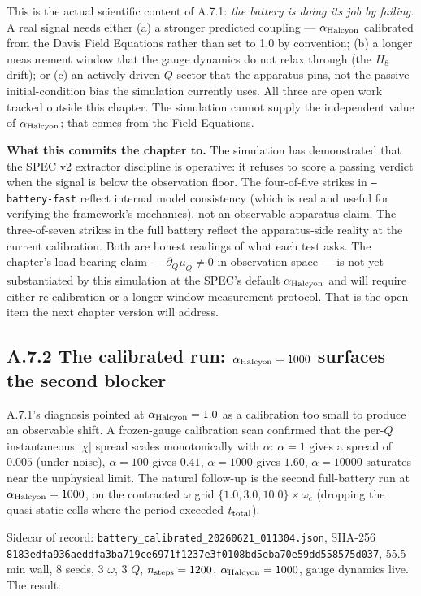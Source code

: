 \documentclass[12pt,a4paper]{article}
\theoremstyle{plain}
\theoremstyle{definition}
\theoremstyle{remark}
\begin{document}
This is the actual scientific content of A.7.1: \emph{the battery is doing its job by failing}. A real signal needs either (a) a stronger predicted coupling --- $\alpha_{\rm Halcyon}$ calibrated from the Davis Field Equations rather than set to 1.0 by convention; (b) a longer measurement window that the gauge dynamics do not relax through (the $H_8$ drift); or (c) an actively driven $Q$ sector that the apparatus pins, not the passive initial-condition bias the simulation currently uses. All three are open work tracked outside this chapter. The simulation cannot supply the independent value of $\alpha_{\rm Halcyon}$; that comes from the Field Equations.

\textbf{What this commits the chapter to.} The simulation has demonstrated that the SPEC v2 extractor discipline is operative: it refuses to score a passing verdict when the signal is below the observation floor. The four-of-five strikes in \texttt{--battery-fast} reflect internal model consistency (which is real and useful for verifying the framework's mechanics), not an observable apparatus claim. The three-of-seven strikes in the full battery reflect the apparatus-side reality at the current calibration. Both are honest readings of what each test asks. The chapter's load-bearing claim --- $\partial_Q \mu_Q \ne 0$ in observation space --- is not yet substantiated by this simulation at the SPEC's default $\alpha_{\rm Halcyon}$ and will require either re-calibration or a longer-window measurement protocol. That is the open item the next chapter version will address.

\subsection*{A.7.2 The calibrated run: $\alpha_{\rm Halcyon}=1000$ surfaces the second blocker}

A.7.1's diagnosis pointed at $\alpha_{\rm Halcyon}=1.0$ as a calibration too small to produce an observable shift. A frozen-gauge calibration scan confirmed that the per-$Q$ instantaneous $|\chi|$ spread scales monotonically with $\alpha$: $\alpha=1$ gives a spread of $0.005$ (under noise), $\alpha=100$ gives $0.41$, $\alpha=1000$ gives $1.60$, $\alpha=10000$ saturates near the unphysical limit. The natural follow-up is the second full-battery run at $\alpha_{\rm Halcyon}=1000$, on the contracted $\omega$ grid $\{1.0, 3.0, 10.0\}\times\omega_c$ (dropping the quasi-static cells where the period exceeded $t_{\rm total}$).

Sidecar of record: \texttt{battery\_calibrated\_20260621\_011304.json}, SHA-256 \texttt{8183edfa936aeddfa3ba719ce6971f1237e3f0108bd5eba70e59dd558575d037}, 55.5\,min wall, 8 seeds, 3 $\omega$, 3 $Q$, $n_{\rm steps}=1200$, $\alpha_{\rm Halcyon}=1000$, gauge dynamics live. The result:
\end{document}
